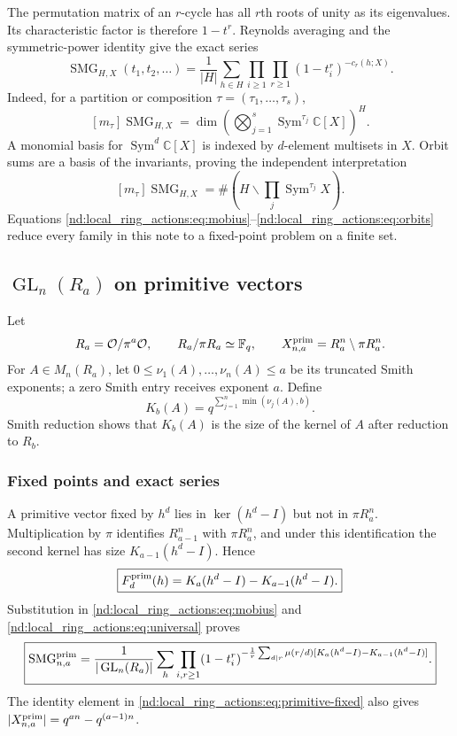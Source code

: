 \documentclass[10pt]{article}
\newcommand{\Sym}{\operatorname{Sym}}
\newcommand{\SMG}{\operatorname{SMG}}
\newcommand{\MGF}{\SMG}
\newcommand{\F}{\mathbb F}
\newcommand{\C}{\mathbb C}
\newcommand{\GL}{\operatorname{GL}}
\newcommand{\calO}{\mathcal O}
\begin{document}
The permutation matrix of an $r$-cycle has all $r$th roots of unity as its
eigenvalues.  Its characteristic factor is therefore $1-t^r$.  Reynolds
averaging and the symmetric-power identity give the exact series
\begin{equation}\label{nd:local_ring_actions:eq:universal}
 \boxed{\MGF_{H,X}(t_1,t_2,\ldots)=\frac1{|H|}\sum_{h\in H}
 \prod_{i\ge1}\prod_{r\ge1}(1-t_i^r)^{-c_r(h;X)}.}
\end{equation}
Indeed, for a partition or composition $\tau=(\tau_1,\ldots,\tau_s)$,
\[
 [m_\tau]\MGF_{H,X}
 =\dim\left(\bigotimes_{j=1}^s\Sym^{\tau_j}\C[X]\right)^H.
\]
A monomial basis for $\Sym^d\C[X]$ is indexed by $d$-element multisets in
$X$.  Orbit sums are a basis of the invariants, proving the independent
interpretation
\begin{equation}\label{nd:local_ring_actions:eq:orbits}
 \boxed{[m_\tau]\MGF_{H,X}
 =\#\left(H\backslash\prod_j\Sym^{\tau_j}X\right).}
\end{equation}
Equations \eqref{nd:local_ring_actions:eq:mobius}--\eqref{nd:local_ring_actions:eq:orbits} reduce every family in this
note to a fixed-point problem on a finite set.

\subsection[GLn over Ra on primitive vectors]{$\GL_n(R_a)$ on primitive vectors}

Let
\[
 R_a=\calO/\pi^a\calO,\qquad R_a/\pi R_a\simeq\F_q,
 \qquad X^{\rm prim}_{n,a}=R_a^n\setminus\pi R_a^n.
\]
For $A\in M_n(R_a)$, let $0\le\nu_1(A),\ldots,\nu_n(A)\le a$ be its
truncated Smith exponents; a zero Smith entry receives exponent $a$.  Define
\begin{equation}\label{nd:local_ring_actions:eq:Kb}
 K_b(A)=q^{\sum_{j=1}^n\min(\nu_j(A),b)}.
\end{equation}
Smith reduction shows that $K_b(A)$ is the size of the kernel of $A$ after
reduction to $R_b$.

\subsubsection{Fixed points and exact series}
A primitive vector fixed by $h^d$ lies in $\ker(h^d-I)$ but not in
$\pi R_a^n$.  Multiplication by $\pi$ identifies $R_{a-1}^n$ with
$\pi R_a^n$, and under this identification the second kernel has size
$K_{a-1}(h^d-I)$.  Hence
\begin{equation}\label{nd:local_ring_actions:eq:primitive-fixed}
 \boxed{F_d^{\rm prim}(h)=K_a(h^d-I)-K_{a-1}(h^d-I).}
\end{equation}
Substitution in \eqref{nd:local_ring_actions:eq:mobius} and \eqref{nd:local_ring_actions:eq:universal} proves
\begin{equation}\label{nd:local_ring_actions:eq:primitive-smg}
 \boxed{\MGF^{\rm prim}_{n,a}=\frac1{|\GL_n(R_a)|}\sum_h
 \prod_{i,r\ge1}(1-t_i^r)^{-\frac1r\sum_{d\mid r}\mu(r/d)
 [K_a(h^d-I)-K_{a-1}(h^d-I)]}.}
\end{equation}
The identity element in \eqref{nd:local_ring_actions:eq:primitive-fixed} also gives
$|X^{\rm prim}_{n,a}|=q^{an}-q^{(a-1)n}$.
\end{document}
